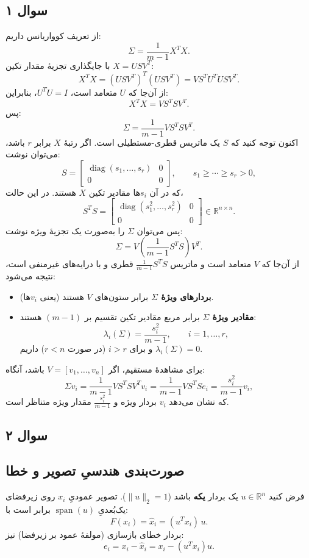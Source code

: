 \documentclass[12pt]{report}
\begin{document}
\subsection{سوال ۱}
  از تعریف کوواریانس داریم:
  \[
  \Sigma=\frac{1}{m-1}X^{T}X.
  \]
  با جایگذاری تجزیهٔ مقدار تکین $X=USV^{T}$:
  \[
  X^{T}X = (USV^{T})^{T}(USV^{T})
        = VS^{T}U^{T}USV^{T}.
  \]
  از آن‌جا که $U$ متعامد است، $U^{T}U=I$، بنابراین:
  \[
  X^{T}X = VS^{T}SV^{T}.
  \]
  پس:
  \[
  \Sigma=\frac{1}{m-1}VS^{T}SV^{T}.
  \]
  اکنون توجه کنید که $S$ یک ماتریس قطری-مستطیلی است. اگر رتبهٔ $X$ برابر $r$ باشد، می‌توان نوشت:
  \[
  S=
  \begin{bmatrix}
  \operatorname{diag}(s_{1},\dots,s_{r}) & 0\\
  0 & 0
  \end{bmatrix},
  \qquad s_{1}\ge \cdots \ge s_{r}>0,
  \]
  که در آن $s_i$ها مقادیر تکین $X$ هستند. در این حالت،
  \[
  S^{T}S=
  \begin{bmatrix}
  \operatorname{diag}(s_{1}^{2},\dots,s_{r}^{2}) & 0\\
  0 & 0
  \end{bmatrix}
  \in\mathbb{R}^{n\times n}.
  \]
  پس می‌توان $\Sigma$ را به‌صورت یک تجزیهٔ ویژه نوشت:
  \[
  \Sigma
  =V\left(\frac{1}{m-1}S^{T}S\right)V^{T}.
  \]
  از آن‌جا که $V$ متعامد است و ماتریس $\frac{1}{m-1}S^{T}S$ قطری و با درایه‌های غیرمنفی است، نتیجه می‌شود:

  \begin{itemize}
  \item \textbf{بردارهای ویژهٔ $\Sigma$} برابر ستون‌های $V$ هستند (یعنی $v_i$ها).
  \item \textbf{مقادیر ویژهٔ $\Sigma$} برابر مربع مقادیر تکین تقسیم بر $(m-1)$ هستند:
  \[
  \lambda_i(\Sigma)=\frac{s_i^{2}}{m-1},\qquad i=1,\dots,r,
  \]
  و برای $i>r$ (در صورت $r<n$) داریم $\lambda_i(\Sigma)=0$.
  \end{itemize}

  برای مشاهدهٔ مستقیم، اگر $V=[v_1,\dots,v_n]$ باشد، آنگاه:
  \[
  \Sigma v_i
  =\frac{1}{m-1}VS^{T}SV^{T}v_i
  =\frac{1}{m-1}VS^{T}Se_i
  =\frac{s_i^{2}}{m-1}v_i,
  \]
  که نشان می‌دهد $v_i$ بردار ویژه و $\frac{s_i^2}{m-1}$ مقدار ویژه متناظر است.






  \subsection{سوال ۲}

  \subsection*{صورت‌بندی هندسیِ تصویر و خطا}
فرض کنید $u\in\mathbb{R}^n$ یک بردار \textbf{یکه} باشد ($\|u\|_2=1$). تصویر عمودیِ $x_i$ روی زیرفضای یک‌بُعدیِ $\operatorname{span}(u)$ برابر است با:
\[
F(x_i)=\hat x_i = (u^{T}x_i)\,u.
\]
بردار خطای بازسازی (مولفهٔ عمود بر زیرفضا) نیز:
\[
e_i = x_i - \hat x_i = x_i - (u^{T}x_i)u.
\]
\end{document}
